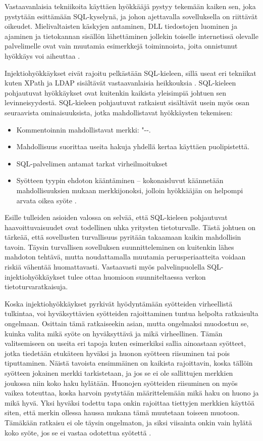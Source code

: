 Vastaavanlaisia tekniikoita käyttäen hyökkääjä pystyy tekemään kaiken sen, joka pystytään esittämään SQL-kyselynä, ja johon ajettavalla
sovelluksella on riittävät oikeudet. Mielivaltaisten käskyjen antaminen, DLL tiedostojen luominen ja ajaminen ja tietokannan
sisällön lähettäminen jollekin toiselle internetissä olevalle palvelimelle ovat vain muutamia esimerkkejä toiminnoista, joita
onnistunut hyökkäys voi aiheuttaa \cite{SQL SS}.

Injektiohyökkäykset eivät rajoitu pelkästään SQL-kieleen, sillä useat eri tekniikat kuten XPath ja LDAP sisältävät vastaavanlaisia 
heikkouksia \cite{WEB2}. SQL-kieleen pohjautuvat hyökkäykset ovat kuitenkin kaikista yleisimpiä johtuen sen levinneisyydestä. SQL-kieleen
pohjautuvat ratkaisut sisältävät usein myös osan seuraavista ominaisuuksista, jotka mahdollistavat hyökkäysten tekemisen:

\begin{itemize}
\item Kommentoinnin mahdollistavat merkki: "{-}{-}.
\item Mahdollisuus suorittaa useita hakuja yhdellä kertaa käyttäen puolipistettä.
\item SQL-palvelimen antamat tarkat virheilmoitukset
\item Syötteen tyypin ehdoton kääntäminen -- kokonaisluvut käännetään mahdollisuuksien mukaan merkkijonoksi, jolloin hyökkääjän
             on helpompi arvata oikea syöte \cite{SQL SS}.
\end{itemize}

Esille tulleiden asioiden valossa on selvää, että SQL-kieleen pohjautuvat haavoittuvaisuudet ovat todellinen uhka yritysten tietoturvalle.
Tästä johtuen on tärkeää, että sovellusten turvallisuus pyritään takaamaan kaikin mahdollisin tavoin. Täysin turvallisen sovelluksen 
suunnitteleminen on kuitenkin lähes mahdoton tehtävä, mutta noudattamalla muutamia perusperiaatteita voidaan riskiä vähentää huomattavasti.
Vastaavasti myös palvelinpuolella SQL-injektiohyökkäykset tulee ottaa huomioon suunniteltaessa verkon tietoturvaratkaisuja.

Koska injektiohyökkäykset pyrkivät hyödyntämään syötteiden virheellistä tulkintaa, voi hyväksyttävien syötteiden rajoittaminen tuntua
helpolta ratkaisulta ongelmaan. Osittain tämä ratkaiseekin asian, mutta ongelmaksi muodostuu se, kuinka valita mikä syöte on hyväksyttävä
ja mikä virheellinen. Tämän valitsemiseen on useita eri tapoja kuten esimerkiksi sallia ainoastaan syötteet, jotka tiedetään etukäteen hyväksi
ja huonon syötteen riisuminen tai pois tiputtaminen. Näistä tavoista ensimmäinen on kaikista rajoittavin, koska tällöin syötteen jokainen 
merkki tarkistetaan, ja jos se ei ole sallittujen merkkien joukossa niin koko haku hylätään. Huonojen syötteiden riisuminen on myös vaikea
toteuttaa, koska harvoin pystytään määrittelemään mikä haku on huono ja mikä hyvä. Yksi hyväksi todettu tapa onkin rajoittaa tiettyjen
merkkien käyttöä siten, että merkin ollessa haussa mukana tämä muutetaan toiseen muotoon. Tämäkään ratkaisu ei ole täysin ongelmaton, ja siksi
viisainta onkin vain hylätä koko syöte, jos se ei vastaa odotettua syötettä \cite{SQL SS}.

